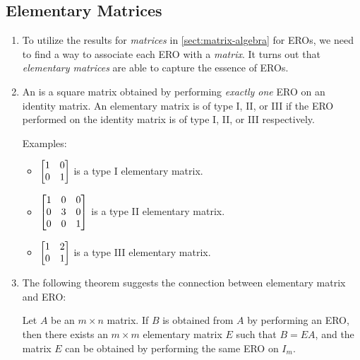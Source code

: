 \subsection{Elementary Matrices}
\begin{enumerate}
\item To utilize the results for \emph{matrices} in \cref{sect:matrix-algebra}
for EROs, we need to find a way to associate each ERO with a \emph{matrix}. It
turns out that \emph{elementary matrices} are able to capture the essence of
EROs.

\item An  is a square matrix obtained by performing
\emph{exactly one} ERO on an identity matrix. An elementary matrix is of type
I, II, or III if the ERO performed on the identity matrix is of type I, II, or
III respectively.

Examples:
\begin{itemize}
\item \(\mqty[1&0\\ 0&1]\) is a type I elementary matrix.
\item \(\mqty[1&0&0\\0&3&0\\ 0&0&1]\) is a type II elementary matrix.
\item \(\mqty[1&2\\ 0&1]\) is a type III elementary matrix.
\end{itemize}

\item The following theorem suggests the connection between elementary matrix
and ERO:
\begin{theorem}
\label{thm:elementary-matrix-ero-relate}
Let \(A\) be an \(m\times n\) matrix. If \(B\) is obtained from \(A\) by
performing an ERO, then there exists an \(m\times m\) elementary matrix \(E\)
such that \(B=EA\), and the matrix \(E\) can be obtained by performing the same
ERO on \(I_m\).


\end{theorem}
\end{enumerate}
